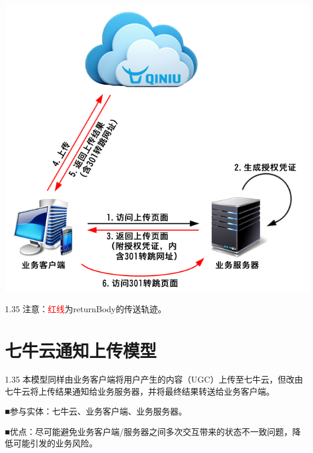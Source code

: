 \documentclass[11pt, oneside]{book}
\newcommand{\qpara}[1]{
\vspace{0.2em}
\begin{spacing}{1.35}
\noindent
#1\par
\end{spacing}
\vspace{0.2em}
}
\newcommand{\qblock}[1]{
\vspace{0.1em}
\noindent
#1\par
\vspace{0.1em}
}
\begin{document}
\begin{center}
\includegraphics[scale=1]{../pics/upload/html_upload_direct.png}
\end{center}

\qpara{注意：\textcolor{red}{红线}为returnBody的传送轨迹。}

\clearpage

\section{七牛云通知上传模型}

\qpara{本模型同样由业务客户端将用户产生的内容（UGC）上传至七牛云，但改由七牛云将上传结果通知给业务服务器，并将最终结果转送给业务客户端。}
\qblock{■\thinspace 参与实体：七牛云、业务客户端、业务服务器。}
\qblock{■\thinspace 优点：尽可能避免业务客户端/服务器之间多次交互带来的状态不一致问题，降低可能引发的业务风险。}
\end{document}
